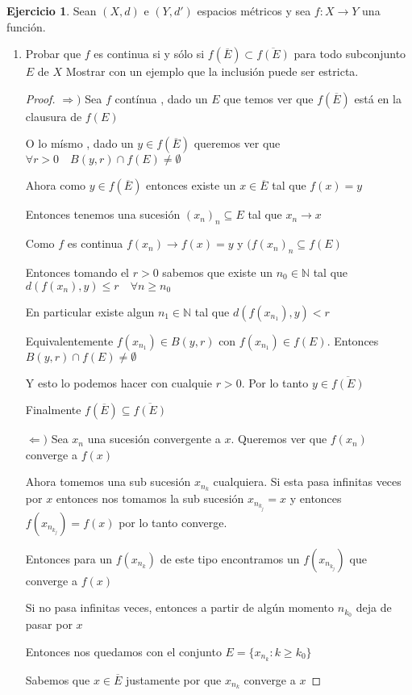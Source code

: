 \documentclass[11pt]{report}
\newcommand{\N}{\mathbb{N}}
\newcommand{\Ra}{\Rightarrow}
\newcommand{\ra}{\rightarrow}
\newcommand{\ol}{\overline}
\theoremstyle{definition}
\newtheorem{ej}{Ejercicio}
\begin{document}
	\begin{ej}
		Sean $(X,d)$ e $(Y,d')$ espacios métricos y sea $f: X \ra Y$ una función.
		\begin{enumerate}
			\item Probar que $f$ es continua si y sólo si $f(\ol E) \subset \ol{f(E)}$ para todo subconjunto $E$ de $X$
				Mostrar con un ejemplo que la inclusión puede ser estricta.
				\begin{proof}
					$\Ra )$ Sea $f$ contínua , dado un $E$ que temos ver que $f(\ol E)$ está en la clausura de $f(E)$

					O lo mísmo , dado un $y \in f(\ol E)$ queremos ver que $\forall r >0 \quad B(y,r) \cap f(E) \neq \emptyset$

					Ahora como $y \in f(\ol E)$ entonces existe un $x \in \ol E$ tal que $f(x) = y$

					Entonces tenemos una sucesión $(x_n)_n \subseteq E$ tal que $x_n \ra x$

					Como $f$ es continua $f(x_n) \ra f(x) = y$ y $(f(x_n)_n \subseteq f(E)$

					Entonces tomando el $r>0$ sabemos que existe un $n_0 \in \N$ tal que $d(f(x_n),y) \leq r \quad \forall n \geq n_0$ 

					En particular existe algun $n_1 \in \N$ tal que $d(f(x_{n_1}),y) < r$ 

					Equivalentemente $f(x_{n_1}) \in B(y,r)$ con $f(x_{n_1}) \in f(E)$. Entonces $B(y,r) \cap f(E) \neq \emptyset$ 

					Y esto lo podemos hacer con cualquie $r>0$. Por lo tanto $y \in \ol{f(E)}$

					Finalmente $f(\ol E) \subseteq \ol{f(E)}$

					$\Leftarrow )$ Sea $x_n$ una sucesión convergente a $x$. Queremos ver que $f(x_n)$ converge a $f(x)$ 

					Ahora tomemos una sub sucesión $x_{n_k}$ cualquiera. Si esta pasa infinitas veces por $x$ entonces nos tomamos la sub sucesión $x_{n_{k_j}} = x$  y entonces $f(x_{n_{k_j}}) = f(x)$ por lo tanto converge.

					Entonces para un $f(x_{n_k})$ de este tipo encontramos un $f(x_{n_{k_j}})$ que converge a $f(x)$

					Si no pasa infinitas veces, entonces a partir de algún momento $n_{k_0}$ deja de pasar por $x$

					Entonces nos quedamos con el conjunto $E = \{ x_{n_{k}}: k \geq k_0 \}$
					
					Sabemos que $x \in \ol E$ justamente por que $x_{n_k}$ converge a $x$


\end{proof}
\end{enumerate}
\end{ej}
\end{document}
